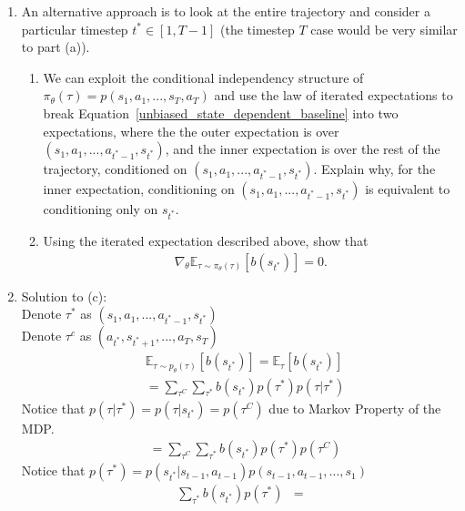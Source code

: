 \documentclass[12pt]{article}
\begin{document}
\begin{enumerate} [label=(\alph*)]
\item An alternative approach is to look at the entire trajectory and consider a particular timestep $t^* \in [1, T-1]$ (the timestep $T$ case would be very similar to part (a)).
\begin{enumerate}
    \item We can exploit the conditional independency structure of $\pi_\theta(\tau) = p(s_1, a_1, ..., s_T, a_T)$ and use the law of iterated expectations to break Equation~\ref{unbiased_state_dependent_baseline} into two expectations, where the the outer expectation is over $(s_1, a_1, ..., a_{t^*-1}, s_{t^*})$, and the inner expectation is over the rest of the trajectory, conditioned on $(s_1, a_1, ..., a_{t^*-1}, s_{t^*})$. Explain why, for the inner expectation, conditioning on $(s_1, a_1, ..., a_{t^*-1}, s_{t^*})$ is equivalent to conditioning only on $s_{t^*}$.
    \item Using the iterated expectation described above, show that
\begin{align} \label{unbiased_state_dependent_baseline}
\nabla_\theta \mathbb{E}_{\tau \sim \pi_\theta(\tau)} \left[b\left(s_{t^*}\right)\right] = 0.
\end{align}
\end{enumerate}

\item Solution to (c):\\
Denote $\tau^*$ as $(s_1, a_1, ..., a_{t^*-1}, s_{t^*})$ \\
Denote $\tau^c$ as $(a_{t^*}, s_{t^*+1}, ..., a_{T}, s_{T})$ \\
\begin{align*}
    &\mathbb{E}_{\tau \sim p_\theta(\tau)} \left[b\left(s_{t^*}\right)\right] = \mathbb{E}_{\tau} \left[b\left(s_{t^*}\right)\right] \\
    &= \sum_{\tau^C} {\sum_{\tau^*} {b(s_{t^*})p(\tau^*)p(\tau|\tau^*)}}
\end{align*}
Notice that $p(\tau|\tau^*)=p(\tau|s_{t^*})=p(\tau^C)$ due to Markov Property of the MDP.
\begin{align*}
	&= \sum_{\tau^C} {\sum_{\tau^*} {b(s_{t^*})p(\tau^*)p(\tau^C )}}
\end{align*}
Notice that $p(\tau^*)=p(s_{t^*}|s_{t-1}, a_{t-1})p(s_{t-1}, a_{t-1}, ..., s_1)$
\begin{align*}
	\sum_{\tau^*} {b(s_{t^*})p(\tau^*)} 
	& = 
\end{align*}
\end{enumerate}
\end{document}
